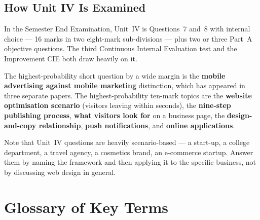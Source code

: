 \section*{How Unit IV Is Examined}

\begin{keybox}
In the Semester End Examination, Unit~IV is Questions~7 and~8 with internal
choice --- 16 marks in two eight-mark sub-divisions --- plus two or three Part~A
objective questions. The third Continuous Internal Evaluation test and the
Improvement CIE both draw heavily on it.

\smallskip
The highest-probability short question by a wide margin is the \textbf{mobile
advertising against mobile marketing} distinction, which has appeared in three
separate papers. The highest-probability ten-mark topics are the
\textbf{website optimisation scenario} (visitors leaving within seconds), the
\textbf{nine-step publishing process}, \textbf{what visitors look for} on a
business page, the \textbf{design-and-copy relationship}, \textbf{push
notifications}, and \textbf{online applications}.

\smallskip
Note that Unit~IV questions are heavily scenario-based --- a start-up, a college
department, a travel agency, a cosmetics brand, an e-commerce startup. Answer them
by naming the framework and then applying it to the specific business, not by
discussing web design in general.
\end{keybox}

\chapter{Glossary of Key Terms}

